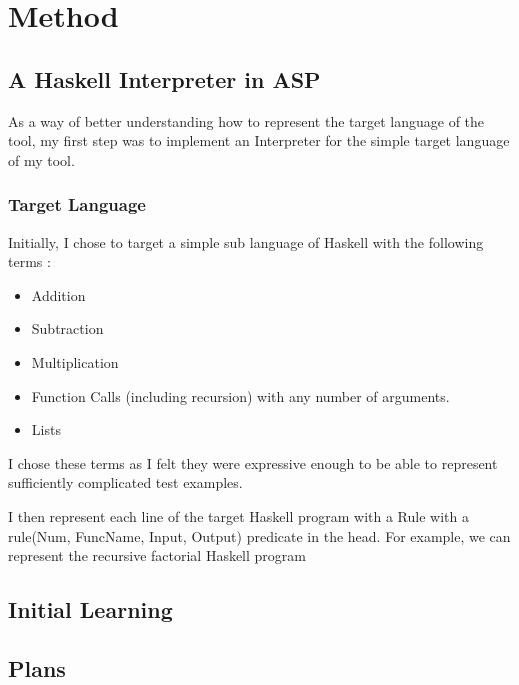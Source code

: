\chapter{Method}

\section{A Haskell Interpreter in ASP}

As a way of better understanding how to represent the target language of the tool, my first step was to implement an Interpreter for the simple target language of my tool.

\subsection{Target Language}

Initially, I chose to target a simple sub language of Haskell with the following terms :

\begin{itemize}
\item Addition
\item Subtraction
\item Multiplication
\item Function Calls (including recursion) with any number of arguments.
\item Lists
\end{itemize}

I chose these terms as I felt they were expressive enough to be able to represent sufficiently complicated test examples.

I then represent each line of the target Haskell program with a Rule with a rule(Num, FuncName, Input, Output) predicate in the head. For example, we can represent the recursive factorial Haskell program


\section{Initial Learning}

\section{Plans}

\pagebreak
\renewcommand\bibname{{References}}

